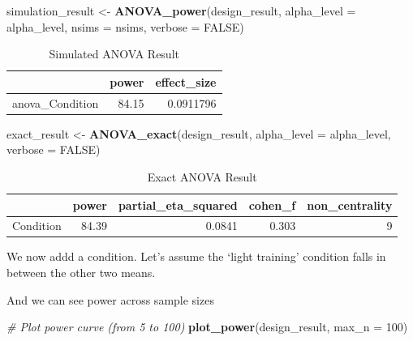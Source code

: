 \documentclass[]{book}
\newenvironment{Shaded}{\begin{snugshade}}{\end{snugshade}}
\newcommand{\CommentTok}[1]{\textcolor[rgb]{0.56,0.35,0.01}{\textit{#1}}}
\newcommand{\DataTypeTok}[1]{\textcolor[rgb]{0.13,0.29,0.53}{#1}}
\newcommand{\DecValTok}[1]{\textcolor[rgb]{0.00,0.00,0.81}{#1}}
\newcommand{\KeywordTok}[1]{\textcolor[rgb]{0.13,0.29,0.53}{\textbf{#1}}}
\newcommand{\NormalTok}[1]{#1}
\newcommand{\OtherTok}[1]{\textcolor[rgb]{0.56,0.35,0.01}{#1}}
\newcommand{\StringTok}[1]{\textcolor[rgb]{0.31,0.60,0.02}{#1}}
\begin{document}
\begin{Shaded}
\begin{Highlighting}[]
\NormalTok{simulation_result <-}\StringTok{ }\KeywordTok{ANOVA_power}\NormalTok{(design_result, }
                                 \DataTypeTok{alpha_level =}\NormalTok{ alpha_level, }
                                 \DataTypeTok{nsims =}\NormalTok{ nsims,}
                                 \DataTypeTok{verbose =} \OtherTok{FALSE}\NormalTok{)}
\end{Highlighting}
\end{Shaded}

\begin{table}[t]

\caption{\label{tab:unnamed-chunk-219}Simulated ANOVA Result}
\centering
\begin{tabular}{l|r|r}
\hline
  & power & effect\_size\\
\hline
anova\_Condition & 84.15 & 0.0911796\\
\hline
\end{tabular}
\end{table}

\begin{Shaded}
\begin{Highlighting}[]
\NormalTok{exact_result <-}\StringTok{ }\KeywordTok{ANOVA_exact}\NormalTok{(design_result,}
                            \DataTypeTok{alpha_level =}\NormalTok{ alpha_level,}
                            \DataTypeTok{verbose =} \OtherTok{FALSE}\NormalTok{)}
\end{Highlighting}
\end{Shaded}

\begin{table}[t]

\caption{\label{tab:unnamed-chunk-221}Exact ANOVA Result}
\centering
\begin{tabular}{l|r|r|r|r}
\hline
  & power & partial\_eta\_squared & cohen\_f & non\_centrality\\
\hline
Condition & 84.39 & 0.0841 & 0.303 & 9\\
\hline
\end{tabular}
\end{table}

We now addd a condition. Let's assume the `light training' condition falls in between the other two means.

And we can see power across sample sizes

\begin{Shaded}
\begin{Highlighting}[]
\CommentTok{# Plot power curve (from 5 to 100)}
\KeywordTok{plot_power}\NormalTok{(design_result, }\DataTypeTok{max_n =} \DecValTok{100}\NormalTok{)}
\end{Highlighting}
\end{Shaded}
\end{document}
